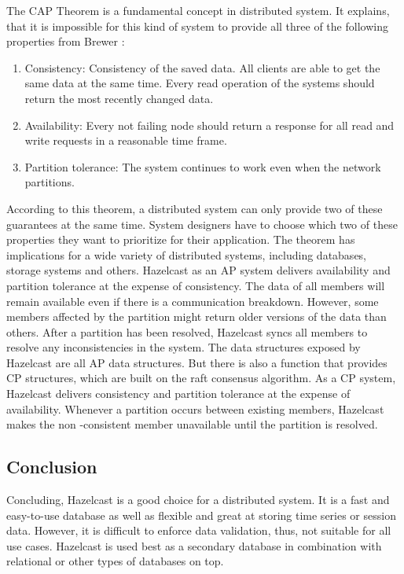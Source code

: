 The CAP Theorem is a fundamental concept in distributed system. It explains, that it is impossible for 
this kind of system to provide all three of the following properties from Brewer \parencite[S.~23]{Brewer.2012}:
\begin{enumerate}
    \item Consistency: Consistency of the saved data. All clients are able to get the same data at the same time. Every read operation of the systems should return the most recently changed data.
    \item Availability: Every not failing node should return a response for all read and write requests in a reasonable time frame.
    \item Partition tolerance: The system continues to work even when the network partitions.
\end{enumerate}

\noindent
According to this theorem, a distributed system can only provide two of these guarantees at the same 
time. System designers have to choose which two of these properties they want to prioritize for their 
application. The theorem has implications for a wide variety of distributed systems, including databases, 
storage systems and others. \parencite[S.~1]{Brewer.2017}
Hazelcast as an AP system delivers availability and partition tolerance at the expense of consistency. 
The data of all members will remain available even if there is a communication breakdown. 
However, some members affected by the partition might return older versions of the data than others. 
After a partition has been resolved, Hazelcast syncs all members to resolve any inconsistencies in the 
system. The data structures exposed by Hazelcast are all AP data structures. 
But there is also a function  that provides CP structures, which are built on the raft consensus algorithm. 
As a CP system, Hazelcast  delivers consistency and partition tolerance at the expense of availability. 
Whenever a partition occurs between existing members, Hazelcast makes the non -consistent member 
unavailable until the partition is resolved. \parencite{Hazelcast.05.04.2023}

\subsection{Conclusion} \label{subsec:conclusionHazelcast}

Concluding, Hazelcast is a good choice for a distributed system. It is a fast and easy-to-use database as well as
flexible and great at storing time series or session data. However, it is difficult to enforce data validation, thus, 
not suitable for all use cases. Hazelcast is used best as a secondary database in combination with relational or other types of databases on top.

